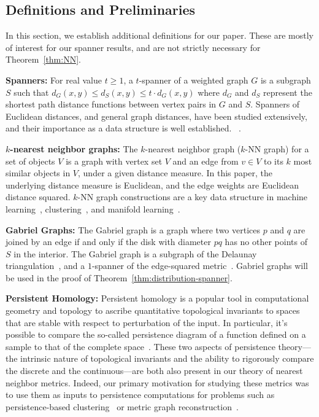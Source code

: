 
\subsection{Definitions and Preliminaries} %
\label{sec:definitions}
In this section, we establish additional definitions for our paper. These
are mostly of interest for our spanner results, and are not strictly
necessary for Theorem~\ref{thm:NN}.


\noindent \textbf{Spanners:} For real value $t \geq 1$, a $t$-spanner of
a weighted graph $G$ is a subgraph $S$ such that $d_G(x,y) \leq d_S(x,y)
\leq t\cdot d_G(x,y)$ where $d_G$ and $d_S$ represent the shortest path
distance functions between vertex pairs in $G$ and $S$. Spanners
of Euclidean distances, and general graph distances, have been
studied extensively, and their importance as a data structure is
well established.
~\cite{Chew1986, Vaidya1991, Callahan1993,HarPeled13}.

\vspace{3 mm}
\noindent \textbf{$k$-nearest neighbor graphs:} The $k$-nearest neighbor graph
($k$-NN graph) for a set of objects $V$ is a graph with vertex set $V$
and an edge from $v\in V$ to its $k$ most similar objects in $V$, under
a given distance measure. In this paper, the underlying distance
measure is Euclidean, and the edge weights are Euclidean distance
squared.
$k$-NN
graph constructions are a key data structure in machine
learning~\cite{Dong11, Chen11}, clustering~\cite{vL09}, and manifold learning~\cite{tenenbaum00global}.

\vspace{3 mm}
\noindent \textbf{Gabriel Graphs:} The Gabriel graph is a graph where
two vertices $p$ and $q$ are joined by an edge if and only if the disk
with diameter $pq$ has no other points of $S$ in the interior. The
Gabriel graph is a subgraph of the Delaunay
triangulation~\cite{SridharMaster}, and a
$1$-spanner of the edge-squared metric~\cite{SridharMaster}. Gabriel
graphs will be used in the proof of
Theorem~\ref{thm:distribution-spanner}.

\vspace{3 mm}
\noindent \textbf{Persistent Homology:}
  Persistent homology is a popular tool in computational geometry and topology to ascribe quantitative topological invariants to spaces that are stable with respect to perturbation of the input.
  In particular, it's possible to compare the so-called persistence diagram of a function defined on a sample to that of the complete space~\cite{chazal08towards}.
  These two aspects of persistence theory---the intrinsic nature of topological invariants and the ability to rigorously compare the discrete and the continuous---are both also present in our theory of nearest neighbor metrics.
  Indeed, our primary motivation for studying these metrics was to use them as inputs to persistence computations for problems such as persistence-based clustering~\cite{chazal13persistence} or metric graph reconstruction~\cite{aanjaneya12metric}.

